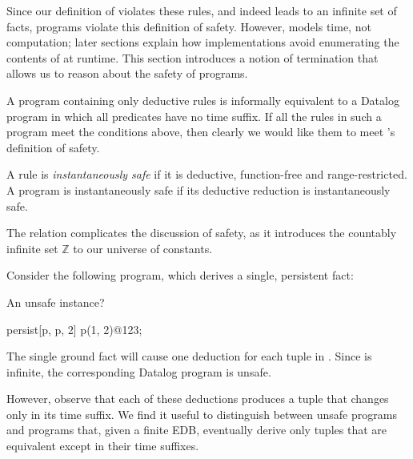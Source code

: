 Since our definition of  violates these rules, and indeed
leads to an infinite set of facts, \slang programs violate this
definition of safety.  However,  models time, not computation;
later sections explain how \lang implementations avoid enumerating the contents
of  at runtime.
This section
introduces a notion of termination that allows us to reason about the safety of
\slang programs.


  



A \slang program containing only deductive rules is informally equivalent to a
Datalog program in which all predicates have no time suffix.  If all the rules
in such a program meet the conditions above, then clearly we would like them to meet \slang's definition of safety. 



\begin{definition}
A rule is \emph{instantaneously safe} if it is deductive,  function-free and range-restricted.
A \slang program is instantaneously safe if its deductive reduction is instantaneously safe.
\end{definition}


The  relation complicates the discussion of safety, as it
introduces the countably infinite set $\mathbb{Z}$ to our
universe of constants.

Consider the following \slang program, which derives a single, persistent fact:









\begin{example}
\label{ex:tempsafe}
An unsafe \slang instance?
\\
\begin{Dedalus}
persist[p\pos, p\nega, 2]
p(1, 2)@123;
\end{Dedalus}


The single ground fact will cause one deduction for each tuple in
.  Since  is infinite, the corresponding
Datalog
program is unsafe.  
\end{example}

However, observe that each of these deductions produces a tuple that changes
only in its time suffix.  We find it useful to distinguish between unsafe
programs and programs that, given a finite EDB, eventually derive only tuples
that are equivalent except in their time suffixes.












